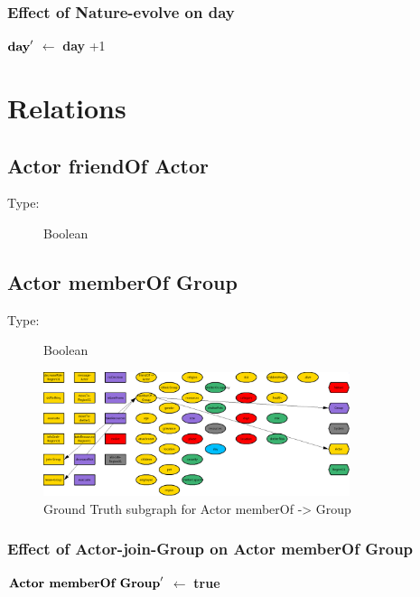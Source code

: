 \documentclass{article}%
\begin{document}
%
\subsubsection{Effect of Nature{-}evolve on day}%
\label{ssubsec:Effect of Nature{-}evolve on day}%
\begin{flushleft}%
$\mbox{\textbf{day}} '$%
$\leftarrow$%
\textbf{day}%
+1%
\end{flushleft}

%
\section{Relations}%
\label{sec:Relations}%
\subsection{Actor friendOf Actor}%
\label{subsec:Actor friendOf Actor}%
\begin{description}%
\item[Type:]%
Boolean%
\end{description}

%
\subsection{Actor memberOf Group}%
\label{subsec:Actor memberOf Group}%
\begin{description}%
\item[Type:]%
Boolean%
\end{description}%


\begin{figure}[ht]%
\centering%
\includegraphics[width=0.8\textwidth]{images/ActormemberOf->Group.png}%
\caption{Ground Truth subgraph for Actor memberOf {-}> Group}%
\end{figure}

%
\subsubsection{Effect of Actor{-}join{-}Group on Actor memberOf Group}%
\label{ssubsec:Effect of Actor{-}join{-}Group on Actor memberOf Group}%
\begin{flushleft}%
$\mbox{\textbf{Actor memberOf Group}} '$%
$\leftarrow$%
\textbf{true}%
\end{flushleft}
\end{document}
